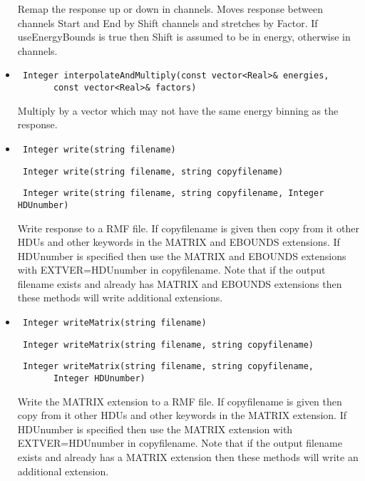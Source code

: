 \documentclass[11pt]{book}
\begin{document}
\begin{itemize}
          Remap the response up or down in channels. Moves response
          between channels Start and End by Shift channels and
          stretches by Factor. If useEnergyBounds is true then Shift
          is assumed to be in energy, otherwise in channels.

\item  \begin{verbatim} Integer interpolateAndMultiply(const vector<Real>& energies, 
       const vector<Real>& factors) \end{verbatim}

          Multiply by a vector which may not have the same energy
          binning as the response.

\item  \begin{verbatim} Integer write(string filename) \end{verbatim}
       \begin{verbatim} Integer write(string filename, string copyfilename) \end{verbatim}
       \begin{verbatim} Integer write(string filename, string copyfilename, Integer HDUnumber) \end{verbatim}

          Write response to a RMF file. If copyfilename is given then
          copy from it other HDUs and other keywords in the MATRIX and
          EBOUNDS extensions. If HDUnumber is specified then use the
          MATRIX and EBOUNDS extensions with EXTVER=HDUnumber in
          copyfilename. Note that if the output filename exists and 
          already has MATRIX and EBOUNDS extensions then these methods 
          will write additional extensions.

\item  \begin{verbatim} Integer writeMatrix(string filename) \end{verbatim}
       \begin{verbatim} Integer writeMatrix(string filename, string copyfilename) \end{verbatim}
       \begin{verbatim} Integer writeMatrix(string filename, string copyfilename,
       Integer HDUnumber) \end{verbatim}

          Write the MATRIX extension to a RMF file. If copyfilename is 
          given then copy from it other HDUs and other keywords in the 
          MATRIX extension. If HDUnumber is specified then use the
          MATRIX extension with EXTVER=HDUnumber in copyfilename. Note 
          that if the output filename exists and already has a MATRIX 
          extension then these methods will write an additional extension.


\end{itemize}
\end{document}
